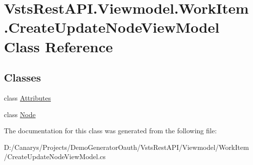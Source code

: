 \hypertarget{class_vsts_rest_a_p_i_1_1_viewmodel_1_1_work_item_1_1_create_update_node_view_model}{}\section{Vsts\+Rest\+A\+P\+I.\+Viewmodel.\+Work\+Item.\+Create\+Update\+Node\+View\+Model Class Reference}
\label{class_vsts_rest_a_p_i_1_1_viewmodel_1_1_work_item_1_1_create_update_node_view_model}
\subsection*{Classes}
\begin{DoxyCompactItemize}
\item 
class \mbox{\hyperlink{class_vsts_rest_a_p_i_1_1_viewmodel_1_1_work_item_1_1_create_update_node_view_model_1_1_attributes}{Attributes}}
\item 
class \mbox{\hyperlink{class_vsts_rest_a_p_i_1_1_viewmodel_1_1_work_item_1_1_create_update_node_view_model_1_1_node}{Node}}
\end{DoxyCompactItemize}


The documentation for this class was generated from the following file\+:\begin{DoxyCompactItemize}
\item 
D\+:/\+Canarys/\+Projects/\+Demo\+Generator\+Oauth/\+Vsts\+Rest\+A\+P\+I/\+Viewmodel/\+Work\+Item/Create\+Update\+Node\+View\+Model.\+cs\end{DoxyCompactItemize}

